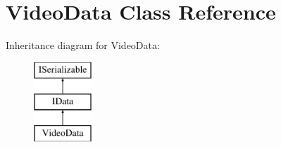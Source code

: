 \hypertarget{class_video_data}{}\section{Video\+Data Class Reference}
\label{class_video_data}
Inheritance diagram for Video\+Data\+:\begin{figure}[H]
\begin{center}
\leavevmode
\includegraphics[height=3.000000cm]{class_video_data}
\end{center}
\end{figure}
